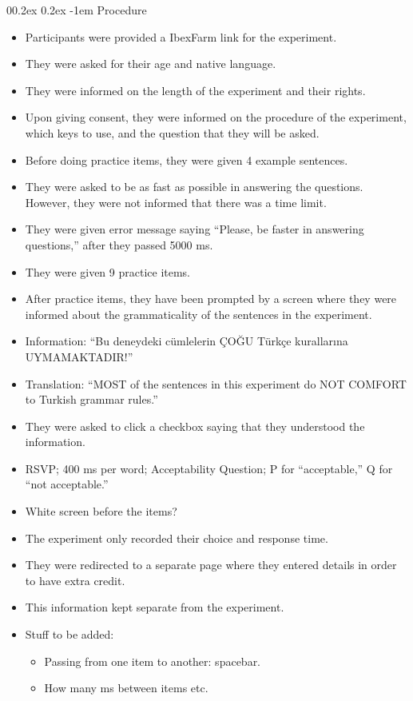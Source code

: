 \documentclass[
  10pt,
  english,
  doc,floatsintext]{apa6}
\makeatletter
\providecommand{\tightlist}{%
  \setlength{\itemsep}{0pt}\setlength{\parskip}{0pt}}
\let\oldparagraph\paragraph
\renewcommand{\paragraph}[1]{\oldparagraph{#1}\mbox{}}
\renewcommand{\paragraph}{\@startsection{paragraph}{4}{\parindent}%
  {0\baselineskip \@plus 0.2ex \@minus 0.2ex}%
  {-1em}%
  {\normalfont\normalsize\bfseries\itshape\typesectitle}}
\makeatother
\begin{document}
\hypertarget{procedure}{%
\paragraph{Procedure}\label{procedure}}

\begin{itemize}
\item
  Participants were provided a IbexFarm link for the experiment.
\item
  They were asked for their age and native language.
\item
  They were informed on the length of the experiment and their rights.
\item
  Upon giving consent, they were informed on the procedure of the experiment, which keys to use, and the question that they will be asked.
\item
  Before doing practice items, they were given 4 example sentences.
\item
  They were asked to be as fast as possible in answering the questions. However, they were not informed that there was a time limit.
\item
  They were given error message saying ``Please, be faster in answering questions,'' after they passed 5000 ms.
\item
  They were given 9 practice items.
\item
  After practice items, they have been prompted by a screen where they were informed about the grammaticality of the sentences in the experiment.
\item
  Information: ``Bu deneydeki cümlelerin ÇOĞU Türkçe kurallarına UYMAMAKTADIR!''
\item
  Translation: ``MOST of the sentences in this experiment do NOT COMFORT to Turkish grammar rules.''
\item
  They were asked to click a checkbox saying that they understood the information.
\item
  RSVP; 400 ms per word; Acceptability Question; P for ``acceptable,'' Q for ``not acceptable.''
\item
  White screen before the items?
\item
  The experiment only recorded their choice and response time.
\item
  They were redirected to a separate page where they entered details in order to have extra credit.
\item
  This information kept separate from the experiment.
\item
  Stuff to be added:

  \begin{itemize}
  \tightlist
  \item
    Passing from one item to another: spacebar.
  \item
    How many ms between items etc.
  \end{itemize}
\end{itemize}
\end{document}
